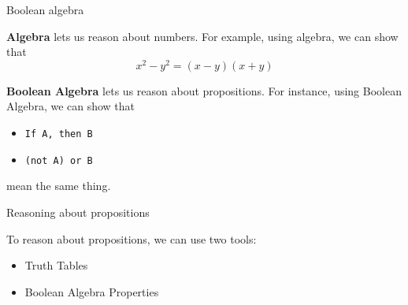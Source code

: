 \documentclass[10pt]{beamer}
\begin{document}


\begin{frame}{Boolean algebra}

\begin{myyellowbox}[title=What is algebra?]
\textbf{Algebra} lets us reason about \alert{numbers}.  For example, using algebra, we can show that
\[ x^2 - y^2 = (x-y)(x+y) \]	
\end{myyellowbox}


\vfill 
\pause 

\begin{mygreenbox}[title=What is Boolean algebra?]
\textbf{Boolean Algebra} lets us reason about \alert{propositions}.   For instance, using Boolean Algebra, we can show that
\begin{itemize}
\item \texttt{If A, then B}	
\item \texttt{(not A) or B}
\end{itemize}
mean the same thing.
\end{mygreenbox}
\end{frame}




\begin{frame}{Reasoning about propositions}

\begin{myredbox}
To reason about propositions, we can use two tools:

\begin{itemize}
	\item Truth Tables
	\item Boolean Algebra Properties
\end{itemize}	
\end{myredbox}
\end{frame}
\end{document}
